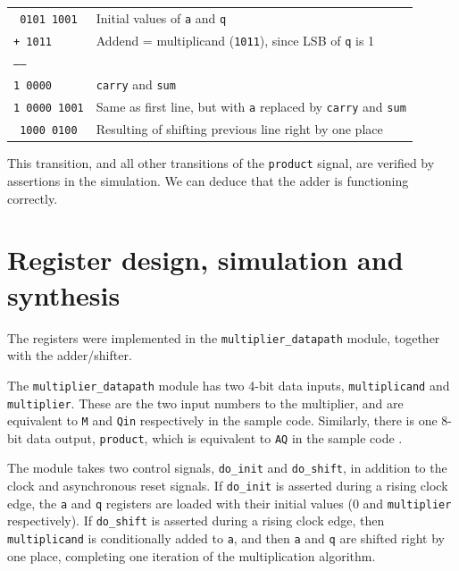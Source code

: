 \documentclass[a4paper]{article}
\begin{document}
\vspace{10pt}
\begin{tabular}{ll}
\texttt{  0101 1001} & Initial values of \texttt{a} and \texttt{q} \\
\texttt{+ 1011     } & Addend = multiplicand (\texttt{1011}), since LSB of \texttt{q} is 1 \\
\texttt{------     } & \\
\texttt{1 0000     } & \texttt{carry} and \texttt{sum} \\
\texttt{1 0000 1001} & Same as first line, but with \texttt{a} replaced by \texttt{carry} and \texttt{sum} \\
\texttt{  1000 0100} & Resulting of shifting previous line right by one place \\
\end{tabular}
\vspace{10pt}

This transition, and all other transitions of the \texttt{product} signal, are verified by assertions in the simulation. We can deduce that the adder is functioning correctly.

\section{Register design, simulation and synthesis}
\label{seg:reg}

The registers were implemented in the \texttt{multiplier\_datapath} module, together with the adder/shifter.

The \texttt{multiplier\_datapath} module has two 4-bit data inputs, \texttt{multiplicand} and \texttt{multiplier}. These are the two input numbers to the multiplier, and are equivalent to \texttt{M} and \texttt{Qin} respectively in the sample code. Similarly, there is one 8-bit data output, \texttt{product}, which is equivalent to \texttt{AQ} in the sample code \cite{samplecode}.

The module takes two control signals, \texttt{do\_init} and \texttt{do\_shift}, in addition to the clock and asynchronous reset signals. If \texttt{do\_init} is asserted during a rising clock edge, the \texttt{a} and \texttt{q} registers are loaded with their initial values (0 and \texttt{multiplier} respectively). If \texttt{do\_shift} is asserted during a rising clock edge, then \texttt{multiplicand} is conditionally added to \texttt{a}, and then \texttt{a} and \texttt{q} are shifted right by one place, completing one iteration of the multiplication algorithm.
\end{document}
